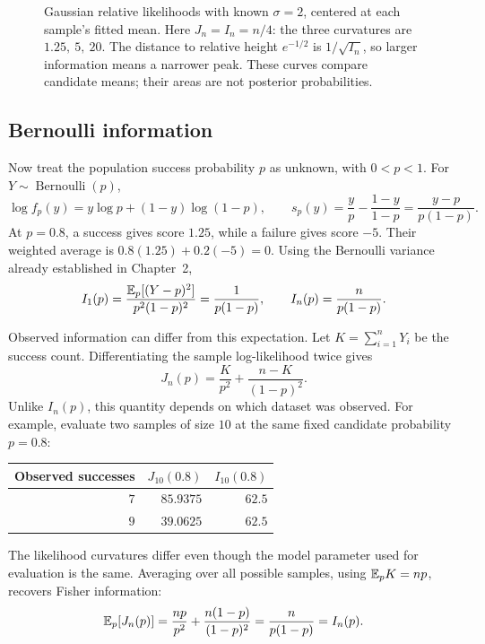 \begin{figure}[H]
  \centering\InfoLikelihoodPlot
  \caption{Gaussian relative likelihoods with known \(\sigma=2\),
  centered at each sample's fitted mean. Here \(J_n=I_n=n/4\):
  the three curvatures are \(1.25,\ 5,\ 20\).
  The distance to relative height \(e^{-1/2}\) is \(1/\sqrt{I_n}\),
  so larger information means a narrower peak. These curves compare
  candidate means; their areas are not posterior probabilities.}
  \label{fig:information-likelihood}
\end{figure}

\subsection{Bernoulli information}

Now treat the population success probability \(p\) as unknown,
with \(0<p<1\). For \(Y\sim\operatorname{Bernoulli}(p)\),
\[
  \log f_p(y)=y\log p+(1-y)\log(1-p),
  \qquad
  s_p(y)=\frac y p-\frac{1-y}{1-p}
        =\frac{y-p}{p(1-p)}.
\]
At \(p=0.8\), a success gives score \(1.25\), while a failure gives
score \(-5\). Their weighted average is
\(0.8(1.25)+0.2(-5)=0\).
Using the Bernoulli variance already established in Chapter~2,
\begin{equation}
  I_1(p)=\frac{\mathbb{E}_p[(Y-p)^2]}{p^2(1-p)^2}
        =\frac1{p(1-p)},\qquad
  I_n(p)=\frac n{p(1-p)}.
  \label{eq:bernoulli-fisher}
\end{equation}

Observed information can differ from this expectation. Let
\(K=\sum_{i=1}^nY_i\) be the success count. Differentiating the sample
log-likelihood twice gives
\begin{equation}
  J_n(p)=\frac{K}{p^2}+\frac{n-K}{(1-p)^2}.
  \label{eq:bernoulli-observed}
\end{equation}
Unlike \(I_n(p)\), this quantity depends on which dataset was observed.
For example, evaluate two samples of size \(10\) at the same fixed
candidate probability \(p=0.8\):
\begin{center}
\begin{tabular}{@{}rrr@{}}
\toprule
Observed successes & \(J_{10}(0.8)\) & \(I_{10}(0.8)\)\\
\midrule
\(7\) & \(85.9375\) & \(62.5\)\\
\(9\) & \(39.0625\) & \(62.5\)\\
\bottomrule
\end{tabular}
\end{center}
The likelihood curvatures differ even though the model parameter used
for evaluation is the same. Averaging over all possible samples,
using \(\mathbb{E}_p K=np\), recovers Fisher information:
\[
  \mathbb{E}_p[J_n(p)]
  =\frac{np}{p^2}+\frac{n(1-p)}{(1-p)^2}
  =\frac{n}{p(1-p)}=I_n(p).
\]

